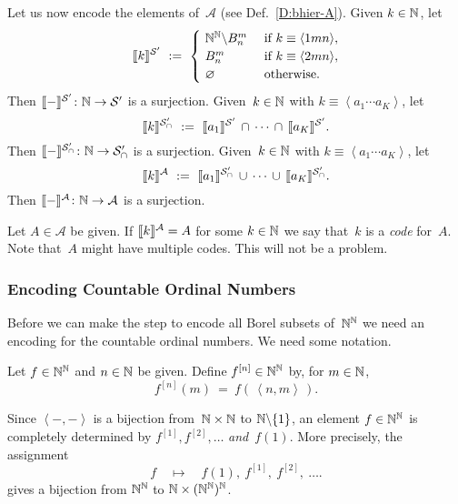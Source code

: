 Let us now encode the elements of~$\mathcal{A}$
 (see Def.~\ref{D:bhier-A}).
Given $k \in \mathbb{N}$, let
\begin{equation*}
 \decode{k}^{\mathcal{S}'}
\ \eqdf \ 
\begin{cases}
\ \N^\N \backslash B^m_n & \text{ if $k\equiv\left<1mn\right>$}, \\
\ B^m_n & \text{ if $k\equiv\left<2mn\right>$}, \\
\ \varnothing &\text{ otherwise.}
\end{cases}
\end{equation*}
Then $\decode-^{\mathcal{S}'}\colon\N\ra \mathcal{S}'$
is a surjection.
Given~$k\in \mathbb{N}$ with $k\equiv \left<a_1\dotsb a_K\right>$, let
\begin{equation*}
 \decode{k}^{\mathcal{S}_\cap'}
\ \eqdf\ 
\decode{a_1}^{\mathcal{S}'} \,\cap\,\dotsb\,\cap\,\decode{a_K}^{\mathcal{S}'}.
\end{equation*}
Then $\decode-^{\mathcal{S}_\cap'}\colon \N\ra {\mathcal{S}_\cap'}$
is a surjection.
Given~$k\in \mathbb{N}$ with $k\equiv \left<a_1\dotsb a_K\right>$, let
\begin{equation*}
 \decode{k}^{\mathcal{A}}
\ \eqdf\ 
\decode{a_1}^{\mathcal{S}_\cap'} \,\cup\,
   \dotsb\,\cup\,\decode{a_K}^{\mathcal{S}_\cap'}.
\end{equation*}
Then $\decode-^{\mathcal{A}}\colon \N\ra {\mathcal{A}}$
is a surjection.

Let $A\in \mathcal{A}$ be given.
If
$\decode{k}^\mathcal{A}=A$
for some 
 $k\in \mathbb{N}$ 
we say
that~$k$ is a \emph{code} for~$A$.
Note that~$A$ might have multiple codes.
This will not be a problem.

\subsubsection{Encoding Countable Ordinal Numbers}$\,$\\
Before we can make the step
to encode all Borel subsets of~$\mathbb{N}^{\mathbb{N}}$
we need an encoding for
the countable ordinal numbers.
We need some notation.
\begin{nt}
Let $f\in\mathbb{N}^{\mathbb{N}}$
and $n\in \mathbb{N}$ be given.
Define $f^{[n]}\in \mathbb{N}^{\mathbb{N}}$ by, for $m\in\mathbb{N}$,
\begin{equation*}
f^{[n]} (m) \ =\ f(\,\left<n,m\right>\,).
\end{equation*}
\end{nt}
Since $\left< -,-\right>$
is a bijection from~$\mathbb{N}\times\mathbb{N}$
to $\mathbb{N}\backslash\{1\}$,
an element $f\in\mathbb{N}^{\mathbb{N}}$
is completely determined
by $f^{[1]},f^{[2]},\dotsc$
\emph{and}~$f(1)$.
More precisely,
the assignment
\begin{equation*}
f\quad\mapsto\quad
 f(1),\ f^{[1]},\  f^{[2]},\ \dotsc.
\end{equation*}
gives a bijection from
$\mathbb{N}^{\mathbb{N}}$ to $\mathbb{N} \times (\mathbb{N}^{\mathbb{N}})^{\mathbb{N}}$.


